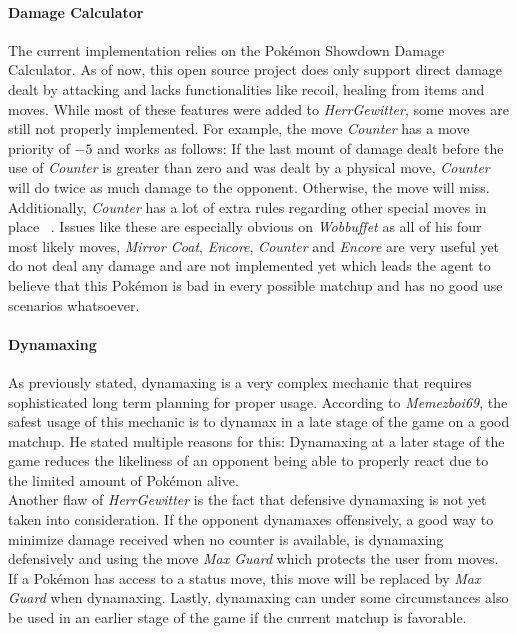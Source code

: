 \paragraph{Damage Calculator}
The current implementation relies on the Pokémon Showdown Damage Calculator. As of now, this open source project does 
only support direct damage dealt by attacking and lacks functionalities like recoil, healing from items and moves. While
most of these features were added to \textit{HerrGewitter}, some moves are still not properly implemented. For example, the move
\textit{Counter} has a move priority of $-5$ and works as follows:
If the last mount of damage dealt before the use of \textit{Counter} is greater than zero and was dealt by a 
physical move, \textit{Counter} will do twice as much damage to the opponent. Otherwise, the move
will miss. Additionally, \textit{Counter} has a lot of extra rules regarding other special moves in place 
~\autocite{Bulbapedia:Counter}. Issues like these are especially obvious on \textit{Wobbuffet} as all of his four
most likely moves, \textit{Mirror Coat}, \textit{Encore}, \textit{Counter} and \textit{Encore} are very useful
yet do not deal any damage and are not implemented yet which leads the agent to believe that this Pokémon is bad 
in every possible matchup and has no good use scenarios whatsoever.

\paragraph{Dynamaxing}
\label{par:eval-dynamx}
As previously stated, dynamaxing is a very complex mechanic that requires sophisticated long term planning for
proper usage. According to \textit{Memezboi69}, the safest usage of this mechanic is to dynamax in a late stage
of the game on a good matchup. He stated multiple reasons for this: 
Dynamaxing at a later stage of the game reduces the likeliness of an opponent being able to properly react due to the 
limited amount of Pokémon alive. \\
Another flaw of \textit{HerrGewitter} is the fact that defensive dynamaxing is not yet taken into consideration. 
If the opponent dynamaxes offensively, a good way to minimize damage received when no counter is available, is dynamaxing
defensively and using the move \textit{Max Guard} which protects the user from moves. If a Pokémon has access to 
a status move, this move will be replaced by \textit{Max Guard} when dynamaxing. Lastly, dynamaxing can under 
some circumstances also be used in an earlier stage of the game if the current matchup is favorable. 

